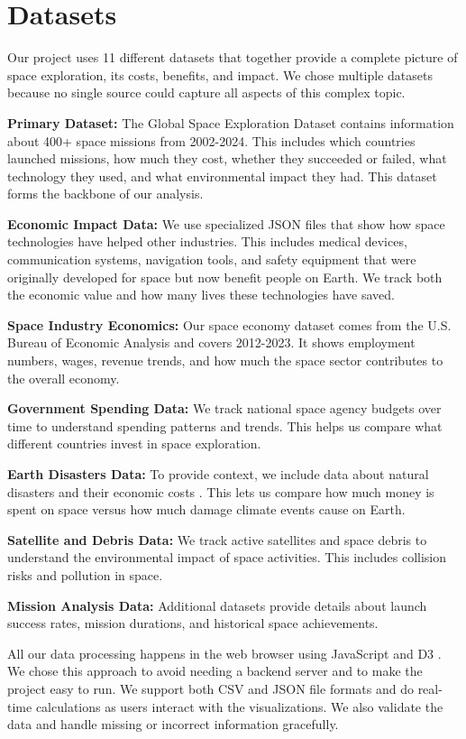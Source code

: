\documentclass[sigconf]{acmart}
\begin{document}
\section{Datasets}

Our project uses 11 different datasets that together provide a complete picture of space exploration, its costs, benefits, and impact. We chose multiple datasets because no single source could capture all aspects of this complex topic.

\textbf{Primary Dataset:} The Global Space Exploration Dataset contains information about 400+ space missions from 2002-2024. This includes which countries launched missions, how much they cost, whether they succeeded or failed, what technology they used, and what environmental impact they had. This dataset forms the backbone of our analysis.

\textbf{Economic Impact Data:} We use specialized JSON files that show how space technologies have helped other industries. This includes medical devices, communication systems, navigation tools, and safety equipment that were originally developed for space but now benefit people on Earth. We track both the economic value and how many lives these technologies have saved.

\textbf{Space Industry Economics:} Our space economy dataset comes from the U.S. Bureau of Economic Analysis and covers 2012-2023. It shows employment numbers, wages, revenue trends, and how much the space sector contributes to the overall economy.

\textbf{Government Spending Data:} We track national space agency budgets over time to understand spending patterns and trends. This helps us compare what different countries invest in space exploration.

\textbf{Earth Disasters Data:} To provide context, we include data about natural disasters and their economic costs \cite{GlobalSpaceData}. This lets us compare how much money is spent on space versus how much damage climate events cause on Earth.

\textbf{Satellite and Debris Data:} We track active satellites and space debris to understand the environmental impact of space activities. This includes collision risks and pollution in space.

\textbf{Mission Analysis Data:} Additional datasets provide details about launch success rates, mission durations, and historical space achievements.

All our data processing happens in the web browser using JavaScript and D3 \cite{BostockD3}. We chose this approach to avoid needing a backend server and to make the project easy to run. We support both CSV and JSON file formats and do real-time calculations as users interact with the visualizations. We also validate the data and handle missing or incorrect information gracefully.
\end{document}
